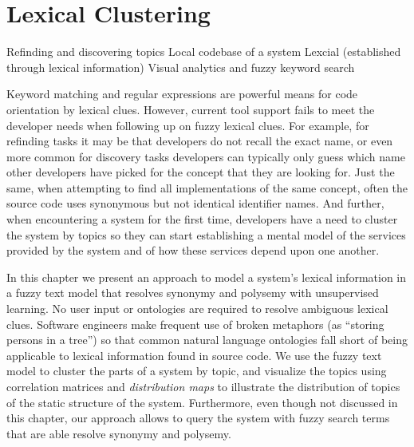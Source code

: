 

\chapter{Lexical Clustering}
\label{the chapter on hapax}

\infobox
	{Refinding and discovering topics}
	{Local codebase of a system}
	{Lexcial (established through lexical information)}
	{Visual analytics and fuzzy keyword search}

Keyword matching and regular expressions are powerful means for code orientation by lexical clues. However, current tool support fails to meet the developer needs when following up on fuzzy lexical clues. For example, for refinding tasks it may be that developers do not recall the exact name, or even more common for discovery tasks developers can typically only guess which name other developers have picked for the concept that they are looking for. Just the same, when attempting to find all implementations of the same concept, often the source code uses synonymous but not identical identifier names. And further, when encountering a system for the first time, developers have a need to cluster the system by topics so they can start establishing a mental model of the services provided by the system and of how these services depend upon one another. 

In this chapter we present an approach to model a system's lexical information in a fuzzy text model that resolves synonymy and polysemy with unsupervised learning. No user input or ontologies are required to resolve ambiguous lexical clues. Software engineers make frequent use of broken metaphors (as \eg ``storing persons in a tree'') so that common natural language ontologies fall short of being applicable to lexical information found in source code. We use the fuzzy text model to cluster the parts of a system by topic, and visualize the topics using correlation matrices and \emph{distribution maps} to illustrate the distribution of topics of the static structure of the system. Furthermore, even though not discussed in this chapter, our approach allows to query the system with fuzzy search terms that are able resolve synonymy and polysemy.

